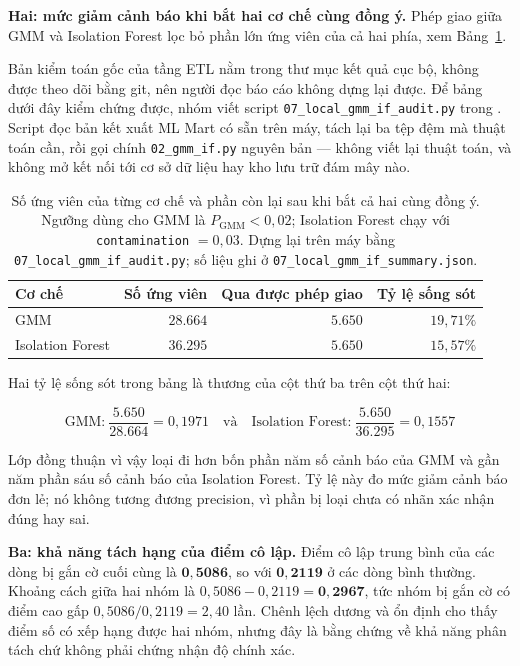 \documentclass[12pt, a4paper]{report}
\begin{document}
\textbf{Hai: mức giảm cảnh báo khi bắt hai cơ chế cùng đồng ý.} Phép giao giữa GMM và
Isolation Forest lọc bỏ phần lớn ứng viên của cả hai phía, xem Bảng~\ref{tab:song_sot_and}.

Bản kiểm toán gốc của tầng ETL nằm trong thư mục kết quả cục bộ, không được theo dõi bằng
git, nên người đọc báo cáo không dựng lại được. Để bảng dưới đây kiểm chứng được, nhóm viết
script \texttt{07\_local\_gmm\_if\_audit.py} trong .
Script đọc bản kết xuất ML Mart có sẵn trên máy, tách lại ba tệp đệm mà thuật toán cần, rồi
gọi chính \texttt{02\_gmm\_if.py} nguyên bản --- không viết lại thuật toán, và không mở kết nối
tới cơ sở dữ liệu hay kho lưu trữ đám mây nào.

\begin{table}[htbp]
\centering
\caption{Số ứng viên của từng cơ chế và phần còn lại sau khi bắt cả hai cùng đồng ý. Ngưỡng
dùng cho GMM là $P_{\text{GMM}} < 0{,}02$; Isolation Forest chạy với
\texttt{contamination} $= 0{,}03$. Dựng lại trên máy bằng
\texttt{07\_local\_gmm\_if\_audit.py}; số liệu ghi ở \texttt{07\_local\_gmm\_if\_summary.json}.}
\label{tab:song_sot_and}
\small
\begin{tabular}{l r r r}
\toprule
\textbf{Cơ chế} & \textbf{Số ứng viên} & \textbf{Qua được phép giao} & \textbf{Tỷ lệ sống sót} \\
\midrule
GMM              & $28.664$ & $5.650$ & $19{,}71\%$ \\
Isolation Forest & $36.295$ & $5.650$ & $15{,}57\%$ \\
\bottomrule
\end{tabular}
\end{table}

Hai tỷ lệ sống sót trong bảng là thương của cột thứ ba trên cột thứ hai:

\begin{equation}
\text{GMM:}\ \frac{5.650}{28.664} = 0{,}1971 \quad\text{và}\quad
\text{Isolation Forest:}\ \frac{5.650}{36.295} = 0{,}1557
\end{equation}

Lớp đồng thuận vì vậy loại đi hơn bốn phần năm số cảnh báo của GMM và gần năm phần sáu số
cảnh báo của Isolation Forest. Tỷ lệ này đo mức giảm cảnh báo đơn lẻ; nó không tương
đương precision, vì phần bị loại chưa có nhãn xác nhận đúng hay sai.

\textbf{Ba: khả năng tách hạng của điểm cô lập.} Điểm cô lập trung bình của các dòng bị
gắn cờ cuối cùng là $\mathbf{0{,}5086}$, so với $\mathbf{0{,}2119}$ ở các dòng bình thường.
Khoảng cách giữa hai nhóm là $0{,}5086 - 0{,}2119 = \mathbf{0{,}2967}$, tức nhóm bị gắn cờ có
điểm cao gấp $0{,}5086 / 0{,}2119 = 2{,}40$ lần. Chênh lệch dương và ổn định cho thấy điểm số
có xếp hạng được hai nhóm, nhưng đây là bằng chứng về khả năng phân tách chứ không phải chứng
nhận độ chính xác.
\end{document}

